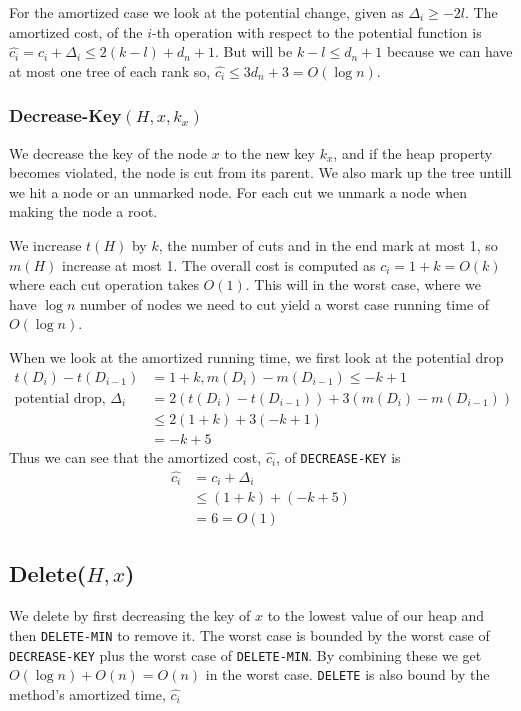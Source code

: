 \documentclass[a4paper,10pt]{article}
\begin{document}
For the amortized case we look at the potential change, given as $\Delta_i \geq -2l$. The amortized cost, of the $i$-th operation with respect to the potential function is $\hat{c_i} = c_i + \Delta_i \leq 2(k - l) + d_n + 1$. But will be $k - l\leq d_n + 1$ because we can have at most one tree of each rank so, $\hat{c_i}\leq 3d_n + 3 = O(\log n)$.

\subsubsection*{Decrease-Key$(H, x, k_x)$}
We decrease the key of the node $x$ to the new key $k_x$, and if the heap property becomes violated, the node is cut from its parent. We also mark up the tree untill we hit a node or an unmarked node. For each cut we unmark a node when making the node a root.

We increase $t(H)$ by $k$, the number of cuts and in the end mark at most 1, so $m(H)$ increase at most 1. The overall cost is computed as $c_i=1+k=O(k)$ where each cut operation takes $O(1)$. This will in the worst case, where we have $\log n$ number of nodes we need to cut yield a worst case running time of $O(\log n)$.

When we look at the amortized running time, we first look at the potential drop
\begin{align*}
t(D_i)-t(D_{i-1}) &= 1 + k, m(D_i)-m(D_{i-1})\leq -k+1\\
\text{potential drop, } \Delta_i &= 2(t(D_i)-t(D_{i-1}))+3(m(D_i)-m(D_{i-1}))\\
&\leq 2(1+k)+3(-k+1)\\
&= -k+5
\end{align*}
Thus we can see that the amortized cost, $\hat{c_i}$, of \texttt{DECREASE-KEY} is
\begin{align*}
  \hat{c_i} &= c_i + \Delta_i\\
  &\leq (1+k)+(-k+5)\\
  &= 6 = O(1)
\end{align*}
\subsection*{Delete($H, x$)}
We delete by first decreasing the key of $x$ to the lowest value of our heap and then \texttt{DELETE-MIN} to remove it. The worst case is bounded by the worst case of \texttt{DECREASE-KEY} plus the worst case of \texttt{DELETE-MIN}. By combining these we get $O(\log n) + O(n) = O(n)$ in the worst case. \texttt{DELETE} is also bound by the method's amortized time, $\hat{c_i}$
\end{document}

